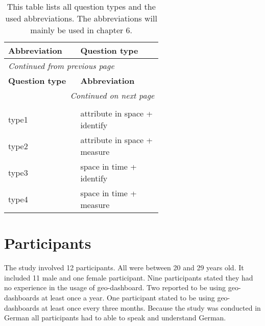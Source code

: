 \begin{longtable}{| p{0.20\linewidth} | p{0.40\linewidth}|}
    \hline
    \textbf{Abbreviation} & \textbf{Question type} \\
    \hline
    \endfirsthead
    \multicolumn{2}{l}{{\textit{Continued from previous page}}} \\
    \hline
    \textbf{Question type} & \textbf{Abbreviation} \\
    \hline
    \endhead
    \hline \multicolumn{2}{r}{{\textit{Continued on next page}}} \\
    \endfoot
    \hline
    \caption{This table lists all question types and the used abbreviations. The abbreviations will mainly be used in chapter 6. \label{questionTypesTable}}\\
    \endlastfoot
    type1 & attribute in space + identify \\
    \hline
    type2 & attribute in space + measure \\
    \hline
    type3 & space in time + identify \\
    \hline
    type4 & space in time + measure\\
\end{longtable}

\section{Participants}
The study involved 12 participants. All were between 20 and 29 years old. It included 11 male and one female participant. Nine
participants stated they had no experience in the usage of geo-dashboard. Two reported to be using geo-dashboards at least once a year. One participant
stated to be using geo-dashboards at least once every three months. Because the study was conducted in German all participants had to able to speak
and understand German.


